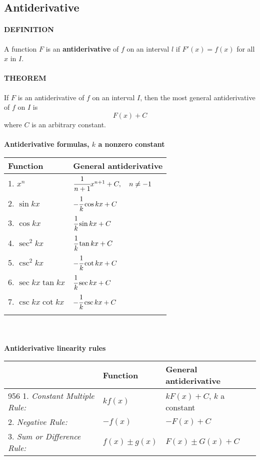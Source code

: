 \documentclass{article}
\begin{document}
        \subsection{Antiderivative}
            \paragraph{DEFINITION} A function $F$ is an \textbf{antiderivative} of $f$ on an interval $l$ if $F'(x)=f(x)$ for all $x$ in $I$.
            \paragraph{THEOREM} If $F$ is an antiderivative of $f$ on an interval $I$, then the most general antiderivative of $f$ on $I$ is
            \[F(x)+C\]
            where $C$ is an arbitrary constant.
            \\\\
            \textbf{Antiderivative formulas, $k$ a nonzero constant}\\
            \begin{tabular}{|ll|}
                \hline
                \textbf{Function}&\textbf{General antiderivative}\\
                \hline
                1. $x^n$&$\cfrac{1}{n+1}x^{n+1}+C,\quad n\ne -1$\\
                2. $\sin kx$&$-\cfrac{1}{k}\cos kx+C$\\
                3. $\cos kx$&$\cfrac{1}{k}\sin kx+C$\\
                4. $\sec ^2 kx$&$\cfrac{1}{k}\tan kx+C$\\
                5. $\csc ^2 kx$&$-\cfrac{1}{k}\cot kx+C$\\
                6. $\sec kx \tan kx$&$\cfrac{1}{k}\sec kx+C$\\
                7. $\csc kx \cot kx$&$-\cfrac{1}{k}\csc kx+C$\\&\\
                \hline
            \end{tabular}
            \\\\
            \textbf{Antiderivative linearity rules}\\
            \begin{tabular}{|lll|}
                \hline
                &\textbf{Function}&\textbf{General antiderivative}\\
                \hline956
                1.  \textit{Constant Multiple Rule:}&$kf(x)$&$kF(x)+C$, $k$ a constant\\
                2.  \textit{Negative Rule:}&$-f(x)$&$-F(x)+C$\\
                3.  \textit{Sum or Difference Rule:}&$f(x)\pm g(x)$&$F(x)\pm G(x)+C$\\
                \hline
            \end{tabular}
\end{document}
